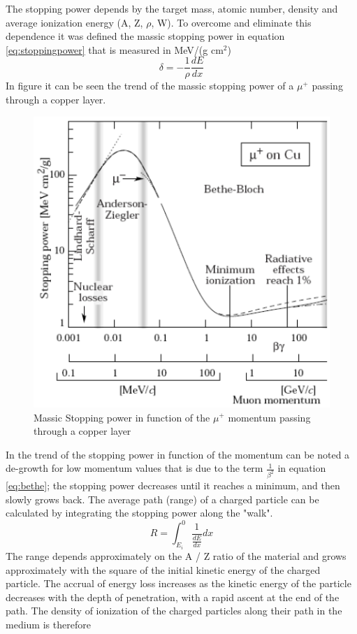 \noindent The stopping power depends by the target mass, atomic number, density and average ionization energy (A, Z, $\rho$, W). To overcome and eliminate this dependence it was defined the massic stopping power in equation \ref{eq:stoppingpower} that is measured in MeV/(g cm${}^2$)
\begin{equation}\label{eq:stoppingpower}
	\delta = - \frac{1}{\rho} \frac{dE}{dx}
\end{equation}
\noindent In figure it can be seen the trend of the massic stopping power of a $\mu^+$ passing through a copper layer.
\begin{figure}[H]
	\centering
	\includegraphics[width=0.7\linewidth]{IMG/ch1/MassicStoppingPower}
	\caption{Massic Stopping power in function of the $\mu^+$ momentum passing through a copper layer}
	\label{fig:massicstoppingpower}
\end{figure}
\noindent In the trend of the stopping power in function of the momentum can be noted a de-growth for low momentum values that is due to the term $\frac{1}{\beta^2}$ in equation \ref{eq:bethe}; the stopping power decreases until it reaches a minimum, and then slowly grows back.
\newline
The average path (range) of a charged particle can be calculated by integrating the stopping power along the "walk".
\begin{equation}\label{eq:range}
	R=\int_{E_i}^{0} \frac{1}{\frac{dE}{dx}}dx
\end{equation}
\noindent The range depends approximately on the A / Z ratio of the material and grows approximately with the square of the initial kinetic energy of the charged particle. The accrual
of energy loss increases as the kinetic energy of the particle decreases with the depth of penetration, with a rapid ascent at the end of the path. The density of ionization of the charged particles along their path in the medium is therefore
